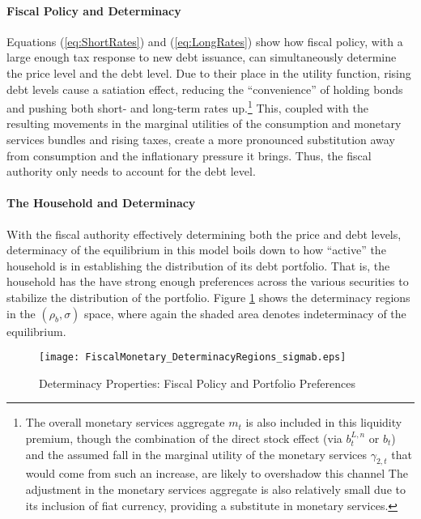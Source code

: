 \documentclass[11pt,a4paper,margin=1.5in]{article}
\begin{document}
\paragraph{Fiscal Policy and Determinacy}
Equations (\ref{eq:ShortRates}) and (\ref{eq:LongRates}) show how fiscal policy, with a large enough tax response to new debt issuance, can simultaneously determine the price level and the debt level.
Due to their place in the utility function, rising debt levels cause a satiation effect, reducing the ``convenience'' of holding bonds and pushing both short- and long-term rates up.\footnote{
	The overall monetary services aggregate $m_t$ is also included in this liquidity premium, though the combination of the direct stock effect (via $b^{L,n}_t$ or $b_t$) and the assumed fall in the marginal utility of the monetary services $\gamma_{2,t}$ that would come from such an increase, are likely to overshadow this channel
	The adjustment in the monetary services aggregate is also relatively small due to its inclusion of fiat currency, providing a substitute in monetary services.}
This, coupled with the resulting movements in the marginal utilities of the consumption and monetary services bundles and rising taxes, create a more pronounced substitution away from consumption and the inflationary pressure it brings.
Thus, the fiscal authority only needs to account for the debt level. 

\paragraph{The Household and Determinacy}
With the fiscal authority effectively determining both the price and debt levels, determinacy of the equilibrium in this model boils down to how ``active'' the household is in establishing the distribution of its debt portfolio.
That is, the household has the have strong enough preferences across the various securities to stabilize the distribution of the portfolio.
Figure \ref{fig:Determinacy_RhoSigma} shows the determinacy regions in the $(\rho_b, \sigma)$ space, where again the shaded area denotes indeterminacy of the equilibrium.
\begin{figure}[h]
\centering
\caption{Determinacy Properties: Fiscal Policy and Portfolio Preferences}
\vspace{0.3em}
\label{fig:Determinacy_RhoSigma}
\texttt{[image: FiscalMonetary\_DeterminacyRegions\_sigmab.eps]}
\end{figure} 
\end{document}
